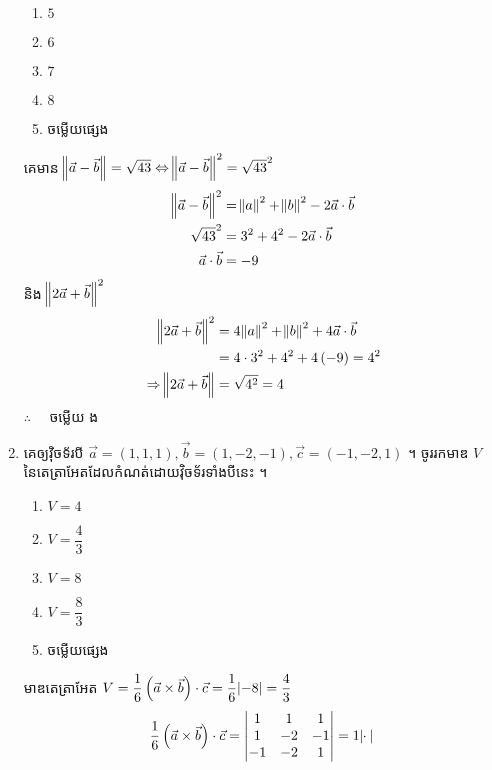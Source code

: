 \documentclass[12pt, a4paper]{article}
\begin{document}
\begin{enumerate}[m]
	\begin{enumerate}[k,5]
		\item $5$
		\item $6$
		\item $7$
		\item $8$
		\item ចម្លើយផ្សេង
	\end{enumerate}
	\answer
	\begin{center}
		គេមាន $\norm{\vec{a}-\vec{b}}=\sqrt{43}\Leftrightarrow \norm{\vec{a}-\vec{b}}^2=\sqrt{43}^2$
		\begin{align*}
		\norm{\vec{a}-\vec{b}}^2&=\norm{a}^2+\norm{b}^2-2\vec{a}\cdot\vec{b}\\
		\sqrt{43}^2&=3^2+4^2-2\vec{a}\cdot \vec{b}\\
		\vec{a}\cdot \vec{b}&=-9
		\end{align*}
		និង $\norm{2\vec{a}+\vec{b}}^2$
		\begin{align*}
		\norm{2\vec{a}+\vec{b}}^2&=4\norm{a}^2+\norm{b}^2+4\vec{a}\cdot \vec{b}\\
		&=4\cdot3^2+4^2+4\left(-9\right)=4^2\\
		\Rightarrow \norm{2\vec{a}+\vec{b}} &= \sqrt{4^2}=4
		\end{align*}
		$\therefore \quad$ \kml ចម្លើយ \kbk ង
	\end{center}
	\newpage
	\item គេឲ្យវ៉ិចទ័របី $\vec{a}=\left(1,1,1\right),\vec{b}=\left(1,-2,-1\right),\vec{c}=\left(-1,-2,1\right)$ ។ ចូររកមាឌ $V$ នៃតេត្រាអែតដែលកំណត់ដោយវ៉ិចទ័រទាំងបីនេះ ។
	\begin{enumerate}[k,5]
		\item $V=4$
		\item $V=\dfrac{4}{3}$
		\item $V=8$
		\item $V=\dfrac{8}{3}$
		\item ចម្លើយផ្សេង
	\end{enumerate}
	\answer
	\begin{center}
		មាឌតេត្រាអែត $V=\dfrac{1}{6}\left(\vec{a}\times\vec{b}\right)\cdot\vec{c}=\dfrac{1}{6}\abs{-8}=\dfrac{4}{3}$
		\begin{eqnarray*}
			\frac{1}{6}\left(\vec{a}\times\vec{b}\right)\cdot\vec{c}&=
			\begin{vmatrix}
				1 & 1 & 1\\ 
				1 & -2 & -1 \\ 
				-1 & -2 & 1 \notag
			\end{vmatrix}
			=1\cdot
			\begin{vmatrix}

\end{vmatrix}
\end{eqnarray*}
\end{center}
\end{enumerate}
\end{document}
